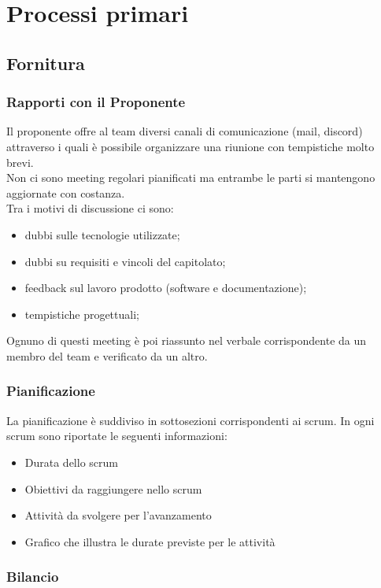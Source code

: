 \section{Processi primari}

\subsection{Fornitura}
\subsubsection{Rapporti con il Proponente}
Il proponente offre al team diversi canali di comunicazione (mail, discord) attraverso i quali è possibile organizzare una riunione con tempistiche molto brevi. \\
Non ci sono meeting regolari pianificati ma entrambe le parti si mantengono aggiornate con costanza. \\
Tra i motivi di discussione ci sono:
\begin{itemize}
    \item dubbi sulle tecnologie utilizzate;
    \item dubbi su requisiti e vincoli del capitolato;
    \item feedback sul lavoro prodotto (software e documentazione);
    \item tempistiche progettuali;
\end{itemize}
Ognuno di questi meeting è poi riassunto nel verbale corrispondente da un membro del team e verificato da un altro.

\subsubsection{Pianificazione}
La pianificazione è suddiviso in sottosezioni corrispondenti ai scrum.
In ogni scrum sono riportate le seguenti informazioni:
\begin{itemize}
    \item Durata dello scrum
    \item Obiettivi da raggiungere nello scrum 
    \item Attività da svolgere per l'avanzamento
    \item Grafico che illustra le durate previste per le attività
\end{itemize}

\subsubsection{Bilancio}


